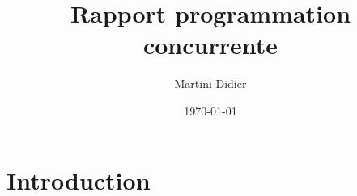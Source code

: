 \documentclass[a4paper]{article}
\title{Rapport programmation concurrente}
\author{Martini Didier}
\date{\today}
\begin{document}
\maketitle


\section{Introduction}
\end{document}
